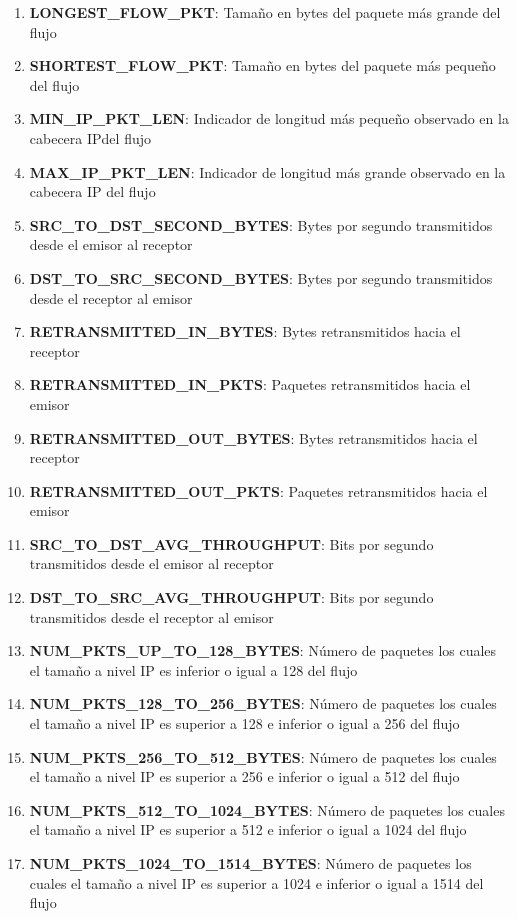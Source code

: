 \begin{enumerate}
    \item \textbf{LONGEST\_FLOW\_PKT}: Tamaño en bytes del paquete más grande del flujo
    \item \textbf{SHORTEST\_FLOW\_PKT}: Tamaño en bytes del paquete más pequeño del flujo
    \item \textbf{MIN\_IP\_PKT\_LEN}: Indicador de longitud más pequeño observado en la cabecera IPdel flujo
    \item \textbf{MAX\_IP\_PKT\_LEN}: Indicador de longitud más grande observado en la cabecera IP del flujo
    \item \textbf{SRC\_TO\_DST\_SECOND\_BYTES}: Bytes por segundo transmitidos desde el emisor al receptor
    \item \textbf{DST\_TO\_SRC\_SECOND\_BYTES}: Bytes por segundo transmitidos desde el receptor al emisor
    \item \textbf{RETRANSMITTED\_IN\_BYTES}: Bytes retransmitidos hacia el receptor
    \item \textbf{RETRANSMITTED\_IN\_PKTS}: Paquetes retransmitidos hacia el emisor
    \item \textbf{RETRANSMITTED\_OUT\_BYTES}: Bytes retransmitidos hacia el receptor
    \item \textbf{RETRANSMITTED\_OUT\_PKTS}: Paquetes retransmitidos hacia el emisor
    \item \textbf{SRC\_TO\_DST\_AVG\_THROUGHPUT}: Bits por segundo transmitidos desde el emisor al receptor
    \item \textbf{DST\_TO\_SRC\_AVG\_THROUGHPUT}: Bits por segundo transmitidos desde el receptor al emisor
    \item \textbf{NUM\_PKTS\_UP\_TO\_128\_BYTES}: Número de paquetes los cuales el tamaño a nivel IP es inferior o igual a 128 del flujo
    \item \textbf{NUM\_PKTS\_128\_TO\_256\_BYTES}: Número de paquetes los cuales el tamaño a nivel IP es superior a 128 e inferior o igual a 256 del flujo
    \item \textbf{NUM\_PKTS\_256\_TO\_512\_BYTES}: Número de paquetes los cuales el tamaño a nivel IP es superior a 256 e inferior o igual a 512 del flujo
    \item \textbf{NUM\_PKTS\_512\_TO\_1024\_BYTES}: Número de paquetes los cuales el tamaño a nivel IP es superior a 512 e inferior o igual a 1024 del flujo
    \item \textbf{NUM\_PKTS\_1024\_TO\_1514\_BYTES}: Número de paquetes los cuales el tamaño a nivel IP es superior a 1024 e inferior o igual a 1514 del flujo

\end{enumerate}
